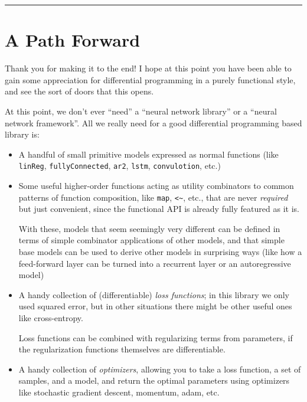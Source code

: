\documentclass[]{article}
\begin{document}
\begin{center}\rule{0.5\linewidth}{\linethickness}\end{center}

\hypertarget{a-path-forward}{%
\section{A Path Forward}\label{a-path-forward}}

Thank you for making it to the end! I hope at this point you have been able to
gain some appreciation for differential programming in a purely functional
style, and see the sort of doors that this opens.

At this point, we don't ever ``need'' a ``neural network library'' or a ``neural
network framework''. All we really need for a good differential programming
based library is:

\begin{itemize}
\item
  A handful of small primitive models expressed as normal functions (like
  \texttt{linReg}, \texttt{fullyConnected}, \texttt{ar2}, \texttt{lstm},
  \texttt{convulotion}, etc.)
\item
  Some useful higher-order functions acting as utility combinators to common
  patterns of function composition, like \texttt{map},
  \texttt{\textless{}\textasciitilde{}}, etc., that are never \emph{required}
  but just convenient, since the functional API is already fully featured as it
  is.

  With these, models that seem seemingly very different can be defined in terms
  of simple combinator applications of other models, and that simple base models
  can be used to derive other models in surprising ways (like how a feed-forward
  layer can be turned into a recurrent layer or an autoregressive model)
\item
  A handy collection of (differentiable) \emph{loss functions}; in this library
  we only used squared error, but in other situations there might be other
  useful ones like cross-entropy.

  Loss functions can be combined with regularizing terms from parameters, if the
  regularization functions themselves are differentiable.
\item
  A handy collection of \emph{optimizers}, allowing you to take a loss function,
  a set of samples, and a model, and return the optimal parameters using
  optimizers like stochastic gradient descent, momentum, adam, etc.
\end{itemize}
\end{document}

